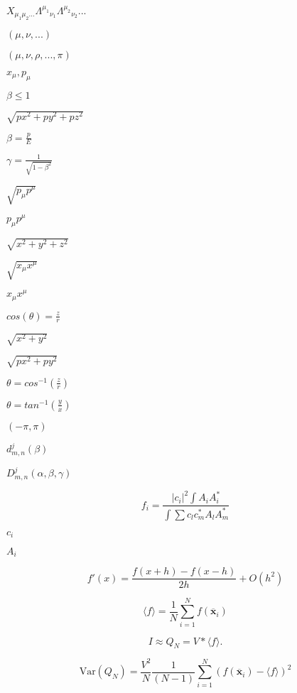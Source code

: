 \documentclass{article}
\begin{document}
$ X_{\mu_1 \mu_2 ...} \Lambda^{\mu_1}{}_{\nu_1} \Lambda^{\mu_2}{}_{\nu_2} ... $
\pagebreak

$(\mu,\nu,...)$
\pagebreak

$ (\mu,\nu,\rho,...,\pi) $
\pagebreak

$ x_{\mu}, p_{\mu} $
\pagebreak

$ \beta \leq 1 $
\pagebreak

$\sqrt{px^2 + py^2 + pz^2}$
\pagebreak

$ \beta = \frac{p}{E} $
\pagebreak

$ \gamma = \frac{1}{\sqrt{1 - \beta^2}} $
\pagebreak

$ \sqrt{p_{\mu} p^{\mu}} $
\pagebreak

$ p_{\mu} p^{\mu} $
\pagebreak

$\sqrt{x^2 + y^2 + z^2}$
\pagebreak

$ \sqrt{x_{\mu} x^{\mu}} $
\pagebreak

$ x_{\mu} x^{\mu} $
\pagebreak

$ cos(\theta) = \frac{z}{r} $
\pagebreak

$\sqrt{x^2 + y^2}$
\pagebreak

$\sqrt{px^2 + py^2}$
\pagebreak

$ \theta = cos^{-1}(\frac{z}{r}) $
\pagebreak

$ \theta = tan^{-1}(\frac{y}{x}) $
\pagebreak

$ (-\pi,\pi) $
\pagebreak

$d^{j}_{m,n}(\beta)$
\pagebreak

$D^{j}_{m,n}(\alpha,\beta,\gamma)$
\pagebreak

\[ f_i = \frac{|c_i|^2 \int A_i A_i^*}{\int \sum c_l c_m^* A_l A_m^*} \]
\pagebreak

$c_i$
\pagebreak

$A_i$
\pagebreak

\[ f'(x) = \frac{f(x+h) - f(x-h)}{2h} + O(h^2) \]
\pagebreak

\[ \langle f \rangle =\frac{1}{N} \sum_{i=1}^N f(\overline{\mathbf{x}}_i) \]
\pagebreak

\[ I \approx Q_N = V*\langle f \rangle. \]
\pagebreak

\[ \mathrm{Var}(Q_N) = \frac{V^2}{N} \frac{1}{(N-1)} \sum_{i=1}^N \left (f(\overline{\mathbf{x}}_i) - \langle f \rangle \right )^2 \]
\pagebreak
\end{document}
